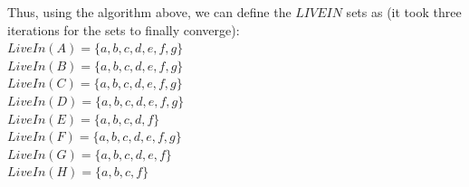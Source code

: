 \documentclass[11pt]{article}
\begin{document}
\begin{enumerate}
\begin{Answer}
		Thus, using the algorithm above, we can define the $LIVEIN$ sets as (it took three iterations for the sets to finally converge): \\
		$LiveIn(A) = \{a, b, c, d, e, f, g\}$ \\
		$LiveIn(B) = \{a, b, c, d, e, f, g\}$ \\
		$LiveIn(C) = \{a, b, c, d, e, f, g\}$ \\
		$LiveIn(D) = \{a, b, c, d, e, f, g\}$ \\
		$LiveIn(E) = \{a, b, c, d, f\}$ \\
		$LiveIn(F) = \{a, b, c, d, e, f, g\}$ \\
		$LiveIn(G) = \{a, b, c, d, e, f\}$ \\
		$LiveIn(H) = \{a, b, c, f\}$ \\
		\end{Answer}
\end{enumerate}
\end{document}
